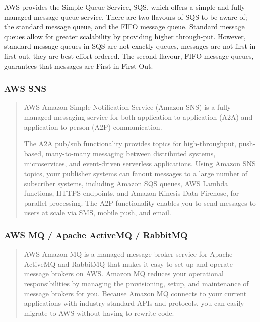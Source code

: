 \documentclass{csse4400}
\begin{document}
AWS provides the Simple Queue Service, SQS,
which offers a simple and fully managed message queue service.
There are two flavours of SQS to be aware of;
the standard message queue, and the FIFO message queue.
Standard message queues allow for greater scalability by providing higher through-put.
However, standard message queues in SQS are not exactly queues,
messages are not first in first out,
they are best-effort ordered.
The second flavour, FIFO message queues,
guarantees that messages are First in First Out.

\subsubsection{AWS SNS}
\begin{quote}{AWS}
Amazon Simple Notification Service (Amazon SNS) is a fully managed messaging service for both application-to-application (A2A) and application-to-person (A2P) communication.

The A2A pub/sub functionality provides topics for high-throughput,
push-based, many-to-many messaging between distributed systems,
microservices, and event-driven serverless applications.
Using Amazon SNS topics,
your publisher systems can fanout messages to a large number of subscriber systems,
including Amazon SQS queues, AWS Lambda functions,
HTTPS endpoints, and Amazon Kinesis Data Firehose,
for parallel processing.
The A2P functionality enables you to send messages to users at scale via SMS, mobile push, and email.
\end{quote}

\subsubsection{AWS MQ / Apache ActiveMQ / RabbitMQ}
\begin{quote}{AWS}
Amazon MQ is a managed message broker service for Apache ActiveMQ and RabbitMQ that makes it easy to set up and operate message brokers on AWS.
Amazon MQ reduces your operational responsibilities by managing the provisioning, setup, and maintenance of message brokers for you.
Because Amazon MQ connects to your current applications with industry-standard APIs and protocols,
you can easily migrate to AWS without having to rewrite code.
\end{quote}

\end{document}
